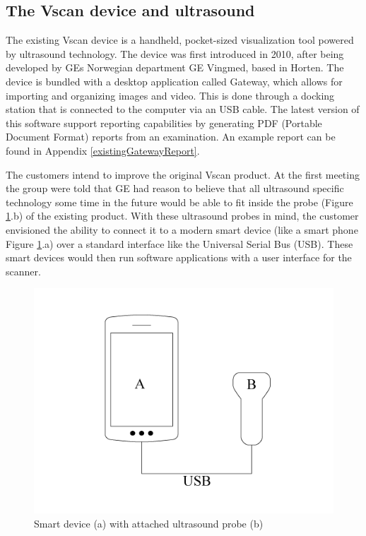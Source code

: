 

\subsection{The Vscan device and ultrasound}
\label{vscan}
The existing Vscan device is a handheld, pocket-sized visualization tool powered by ultrasound technology. The device was first introduced in 2010, after being developed by GEs Norwegian department GE Vingmed, based in Horten. The device is bundled with a desktop application called Gateway, which allows for importing and organizing images and video. This is done through a docking station that is connected to the computer via an USB cable. The latest version of this software support reporting capabilities by generating PDF (Portable Document Format) reports from an examination. An example report can be found in Appendix \ref{existingGatewayReport}.

The customers intend to improve the original Vscan product. At the first meeting the group were told that GE had reason to believe that all ultrasound specific technology some time in the future would be able to fit inside the probe (Figure \ref{fig:ultraprobe}.b) of the existing product. With these ultrasound probes in mind, the customer envisioned the ability to connect it to a modern smart device (like a smart phone Figure \ref{fig:ultraprobe}.a) over a standard interface like the Universal Serial Bus (USB). These smart devices would then run software applications with a user interface for the scanner.

\begin{figure}[H]
\centering
\includegraphics[scale=0.4]{img/ultraprobe.png}
\caption{Smart device (a) with attached ultrasound probe (b)}
\label{fig:ultraprobe}
\end{figure}

